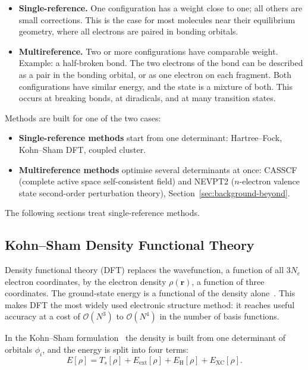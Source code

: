 \begin{itemize}
  \item \textbf{Single-reference.} One configuration has a weight close to
    one; all others are small corrections. This is the case for most
    molecules near their equilibrium geometry, where all electrons are paired
    in bonding orbitals.
  \item \textbf{Multireference.} Two or more configurations have comparable
    weight. Example: a half-broken bond. The two electrons of the bond can
    be described as a pair in the bonding orbital, or as one electron on
    each fragment. Both configurations have similar energy, and the state is
    a mixture of both. This occurs at breaking bonds, at diradicals, and at
    many transition states.
\end{itemize}

Methods are built for one of the two cases:

\begin{itemize}
  \item \textbf{Single-reference methods} start from one determinant:
    Hartree--Fock, Kohn--Sham DFT, coupled cluster.
  \item \textbf{Multireference methods} optimise several determinants at
    once: CASSCF (complete active space self-consistent field) and
    NEVPT2 ($n$-electron valence state second-order perturbation theory),
    Section~\ref{sec:background-beyond}.
\end{itemize}

The following sections treat single-reference methods.


\subsection{Kohn--Sham Density Functional Theory}
\label{sec:background-dft}

Density functional theory (DFT) replaces the wavefunction, a function of all
$3N_e$ electron coordinates, by the electron density $\rho(\mathbf{r})$, a
function of three coordinates. The ground-state energy is a functional of
the density alone~\cite{hohenberg1964}. This makes DFT the most widely used
electronic structure method: it reaches useful accuracy at a cost of
$\mathcal{O}(N^3)$ to $\mathcal{O}(N^4)$ in the number of basis functions.

In the Kohn--Sham formulation~\cite{kohn1965} the density is built from one
determinant of orbitals $\phi_i$, and the energy is split into four terms:
%
\begin{equation}
  E[\rho] = T_s[\rho] + E_\text{ext}[\rho] + E_\text{H}[\rho] + E_\text{XC}[\rho] .
  \label{eq:ks-energy}
\end{equation}

